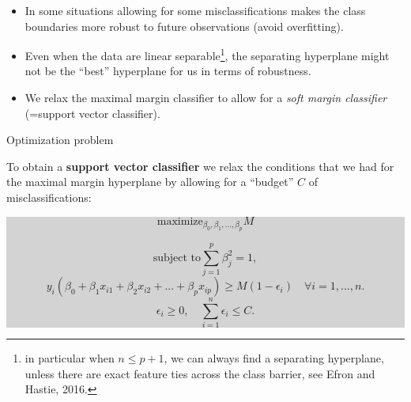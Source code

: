\documentclass[10pt,ignorenonframetext,]{beamer}
\begin{document}
\begin{frame}

\begin{itemize}
\item
  In some situations allowing for some misclassifications makes the
  class boundaries more robust to future observations (avoid
  overfitting).
\item
  Even when the data are linear
  separable\footnote{in particular when $n\leq p+1$, we can always find a separating hyperplane, unless there are exact feature ties across the class barrier, see Efron and Hastie, 2016.},
  the separating hyperplane might not be the ``best'' hyperplane for us
  in terms of robustness.
\item
  We relax the maximal margin classifier to allow for a \emph{soft
  margin classifier} (=support vector classifier).
\end{itemize}

\end{frame}

\begin{frame}

\begin{block}{Optimization problem}

\vspace{2mm}

To obtain a \textbf{support vector classifier} we relax the conditions
that we had for the maximal margin hyperplane by allowing for a
``budget'' \(C\) of misclassifications: \vspace{2mm}

\colorbox{lightgray}{\begin{minipage}{10cm}
$$\mathrm{maximize}_{\beta_0,\beta_1,...,\beta_p}  M $$

$$\text{subject to} \sum_{j=1}^p \beta_j^2=1,$$
$$y_i(\beta_0+\beta_1 x_{i1}+\beta_2 x_{i2}+...+\beta_p x_{ip})\geq M(1-\epsilon_i) \quad  \forall i=1,...,n.$$
$$\epsilon_i\geq 0, \quad \sum_{i=1}^n \epsilon_i \leq C.$$
\end{minipage}}

\end{block}

\end{frame}
\end{document}

